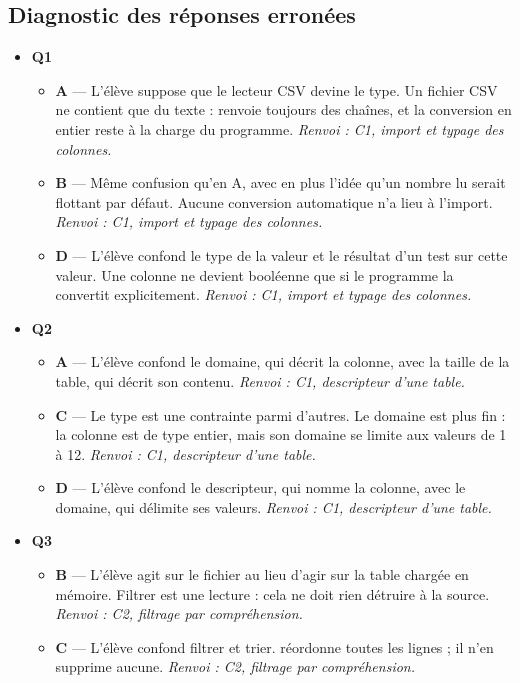 \subsection*{Diagnostic des réponses erronées}

\begin{itemize}
  \item \textbf{Q1}
  \begin{itemize}
    \item \textbf{A} — L'élève suppose que le lecteur CSV devine le type. Un fichier CSV ne contient que du texte :  renvoie toujours des chaînes, et la conversion en entier reste à la charge du programme. \emph{Renvoi : C1, import et typage des colonnes.}
    \item \textbf{B} — Même confusion qu'en A, avec en plus l'idée qu'un nombre lu serait flottant par défaut. Aucune conversion automatique n'a lieu à l'import. \emph{Renvoi : C1, import et typage des colonnes.}
    \item \textbf{D} — L'élève confond le type de la valeur et le résultat d'un test sur cette valeur. Une colonne ne devient booléenne que si le programme la convertit explicitement. \emph{Renvoi : C1, import et typage des colonnes.}
  \end{itemize}
  \item \textbf{Q2}
  \begin{itemize}
    \item \textbf{A} — L'élève confond le domaine, qui décrit la colonne, avec la taille de la table, qui décrit son contenu. \emph{Renvoi : C1, descripteur d'une table.}
    \item \textbf{C} — Le type est une contrainte parmi d'autres. Le domaine est plus fin : la colonne  est de type entier, mais son domaine se limite aux valeurs de 1 à 12. \emph{Renvoi : C1, descripteur d'une table.}
    \item \textbf{D} — L'élève confond le descripteur, qui nomme la colonne, avec le domaine, qui délimite ses valeurs. \emph{Renvoi : C1, descripteur d'une table.}
  \end{itemize}
  \item \textbf{Q3}
  \begin{itemize}
    \item \textbf{B} — L'élève agit sur le fichier au lieu d'agir sur la table chargée en mémoire. Filtrer est une lecture : cela ne doit rien détruire à la source. \emph{Renvoi : C2, filtrage par compréhension.}
    \item \textbf{C} — L'élève confond filtrer et trier.  réordonne toutes les lignes ; il n'en supprime aucune. \emph{Renvoi : C2, filtrage par compréhension.}

\end{itemize}
\end{itemize}
